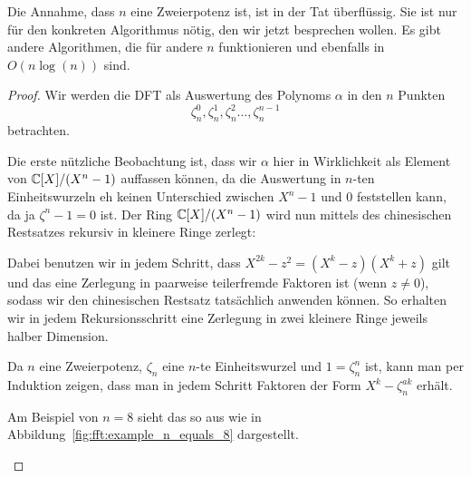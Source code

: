 \begin{remark}
    Die Annahme, dass $n$ eine Zweierpotenz ist, ist in der Tat überflüssig. Sie ist nur für den konkreten Algorithmus nötig, den wir jetzt besprechen wollen. Es gibt andere Algorithmen, die für andere $n$ funktionieren und ebenfalls in $O(n\log(n))$ sind.
\end{remark}
\begin{proof}
    Wir werden die DFT als Auswertung des Polynoms $\alpha$ in den $n$ Punkten
    \[\zeta_n^0, \zeta_n^1,\zeta_n^2 \ldots, \zeta_n^{n-1}\]
    betrachten.

    \smallskip
    Die erste nützliche Beobachtung ist, dass wir $\alpha$ hier in Wirklichkeit als Element von $\mathbb{C}[X]/(X^n-1)$ auffassen können, da die Auswertung in $n$-ten Einheitswurzeln eh keinen Unterschied zwischen $X^n-1$ und $0$ feststellen kann, da ja $\zeta^n-1=0$ ist. Der Ring $\mathbb{C}[X]/(X^n-1)$ wird nun mittels des chinesischen Restsatzes rekursiv in kleinere Ringe zerlegt:

    Dabei benutzen wir in jedem Schritt, dass $X^{2k}-z^2 = (X^k-z)(X^k+z)$ gilt und das eine Zerlegung in paarweise teilerfremde Faktoren ist (wenn $z\neq 0$), sodass wir den chinesischen Restsatz tatsächlich anwenden können. So erhalten wir in jedem Rekursionsschritt eine Zerlegung in zwei kleinere Ringe jeweils halber Dimension.

    Da $n$ eine Zweierpotenz, $\zeta_n$ eine $n$-te Einheitswurzel und $1=\zeta_n^n$ ist, kann man per Induktion zeigen, dass man in jedem Schritt Faktoren der Form $X^k-\zeta_n^{ak}$ erhält.

    \medskip
    Am Beispiel von $n=8$ sieht das so aus wie in Abbildung~\ref{fig:fft:example_n_equals_8} dargestellt.

    \begin{figure}[htp]
        \centering
\end{figure}
\end{proof}
